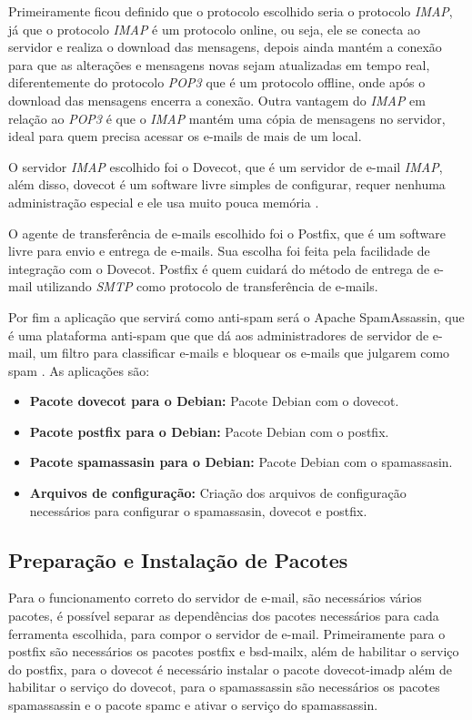 Primeiramente ficou definido que o protocolo escolhido seria o protocolo \textit{IMAP}, já
que o protocolo \textit{IMAP} é um protocolo online, ou seja, ele se conecta ao servidor
e realiza o download das mensagens, depois ainda  mantém a conexão para que
as alterações e mensagens novas sejam atualizadas em tempo real, diferentemente do
protocolo \textit{POP3} que é um protocolo offline, onde após o download das mensagens encerra
a conexão. Outra vantagem do \textit{IMAP} em relação ao \textit{POP3} é que o 
\textit{IMAP} mantém uma cópia de mensagens no servidor, ideal para quem precisa 
acessar os e-mails de mais de um local.

O servidor \textit{IMAP} escolhido foi o Dovecot, que é um servidor de e-mail
\textit{IMAP}, além disso, dovecot é um software livre simples de configurar, requer nenhuma
administração especial e ele usa muito pouca memória \cite{dovecot}. 

O agente de transferência de e-mails escolhido foi o Postfix, que é um software
livre para envio e entrega de e-mails. Sua escolha foi feita pela facilidade de
integração com o Dovecot. Postfix é quem cuidará do método de entrega de e-mail
utilizando \textit{SMTP} como protocolo de transferência de e-mails. 

Por fim a aplicação que servirá como anti-spam será o Apache SpamAssassin, que 
é uma plataforma anti-spam que que dá aos administradores de servidor de e-mail, 
um filtro para classificar e-mails e bloquear os e-mails que julgarem como spam \cite{spam}. 
As aplicações são:

\begin{itemize}
   \item \textbf{Pacote dovecot para o Debian:} Pacote Debian com o dovecot.
   \item \textbf{Pacote postfix para o Debian:} Pacote Debian com o postfix.
   \item \textbf{Pacote spamassasin para o Debian:} Pacote Debian com o spamassasin.
   \item \textbf{Arquivos de configuração:} Criação dos arquivos de configuração
   necessários para configurar o spamassasin, dovecot e postfix.
\end{itemize}

\subsection{Preparação e Instalação de Pacotes }

Para o funcionamento correto do servidor de e-mail, são necessários vários pacotes, 
é possível separar as dependências dos pacotes necessários para cada ferramenta
escolhida, para compor o servidor de e-mail. Primeiramente para o postfix são necessários
os pacotes postfix e bsd-mailx, além de habilitar o serviço do postfix, para o dovecot
é necessário instalar o pacote dovecot-imadp além de habilitar o serviço do dovecot,
para o spamassassin são necessários os pacotes spamassassin e o pacote spamc e ativar
o serviço do spamassassin.

